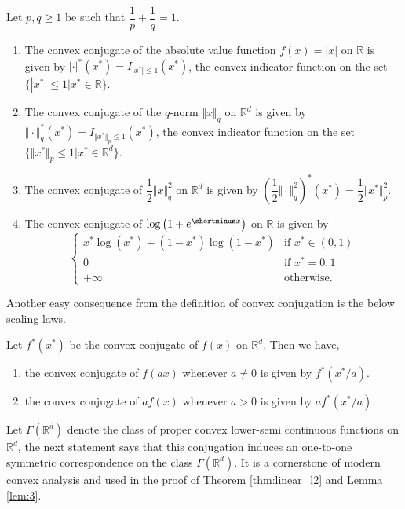 \documentclass[12pt]{article}
\begin{document}
\begin{prop}
\label{prop:examples_conjugates}
Let $p,q\geq 1$ be such that $\dfrac{1}{p}+\dfrac{1}{q}=1$.
    \begin{enumerate}
        \item The convex conjugate of the absolute value function $f(x) = |x|$ on $\mathbb{R}$ is given by $|\cdot|^*(x^*) = I_{|x^*|\leq 1}(x^*)$, the convex indicator function on the set $\{|x^*|\leq 1 | x^*\in\mathbb{R}\}$.

        \item The convex conjugate of the $q$-norm $\Vert x\Vert_q$ on $\mathbb{R}^d$ is given by $\Vert \cdot \Vert_q^*(x^*) = I_{\Vert x^*\Vert_p\leq 1}(x^*)$, the convex indicator function on the set $\{\Vert x^*\Vert_p\leq 1 | x^*\in \mathbb{R}^d\}$.

        \item The convex conjugate of $\dfrac{1}{2}\Vert x\Vert_q^2$ on $\mathbb{R}^d$ is given by $\left(\dfrac{1}{2}\Vert \cdot\Vert_q^2 \right)^* (x^*) = \dfrac{1}{2}\Vert x^*\Vert_p^2$.

        \item The convex conjugate of $\log{\big(1+e^{\shortminus x}\big)}$ on $\mathbb{R}$ is given by 
        \[
        \begin{cases}
            x^*\log{(x^*)} + (1-x^*)\log{(1-x^*)} &\text{if }x^*\in (0,1)\\
            0 &\text{if } x^* = 0,1\\
            +\infty &\text{otherwise}.
        \end{cases}
        \]
    \end{enumerate}
\end{prop}

Another easy consequence from the definition of convex conjugation is the below scaling laws.
\begin{prop}
\label{prop:scaling_laws}
    Let $f^*(x^*)$ be the convex conjugate of $f(x)$ on $\mathbb{R}^d$. Then we have,\begin{enumerate}
        \item the convex conjugate of $f(ax)$ whenever $a\neq 0$ is given by $f^*(x^*/a)$.
        \item the convex conjugate of $af(x)$ whenever $a>0$ is given by $af^*(x^*/a)$.
    \end{enumerate}
\end{prop}

Let $\Gamma\left(\mathbb{R}^d\right)$ denote the class of proper convex lower-semi continuous functions on $\mathbb{R}^d$, the next statement says that this conjugation induces an one-to-one symmetric correspondence on the class $\Gamma\left(\mathbb{R}^d\right)$. It is a cornerstone of modern convex analysis and used in the proof of Theorem \ref{thm:linear_l2} and Lemma \ref{lem:3}.
\end{document}
